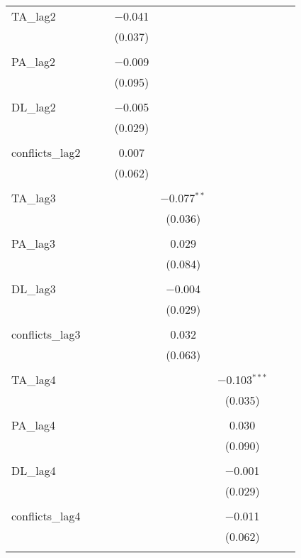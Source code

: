 \begin{table}[!htbp]
\begin{tabular}{@{\extracolsep{5pt}}lccccccc}
 TA\_lag2 &  &  & $-$0.041 &  &  &  &  \\ 
  &  &  & (0.037) &  &  &  &  \\ 
  & & & & & & & \\ 
 PA\_lag2 &  &  & $-$0.009 &  &  &  &  \\ 
  &  &  & (0.095) &  &  &  &  \\ 
  & & & & & & & \\ 
 DL\_lag2 &  &  & $-$0.005 &  &  &  &  \\ 
  &  &  & (0.029) &  &  &  &  \\ 
  & & & & & & & \\ 
 conflicts\_lag2 &  &  & 0.007 &  &  &  &  \\ 
  &  &  & (0.062) &  &  &  &  \\ 
  & & & & & & & \\ 
 TA\_lag3 &  &  &  & $-$0.077$^{**}$ &  &  &  \\ 
  &  &  &  & (0.036) &  &  &  \\ 
  & & & & & & & \\ 
 PA\_lag3 &  &  &  & 0.029 &  &  &  \\ 
  &  &  &  & (0.084) &  &  &  \\ 
  & & & & & & & \\ 
 DL\_lag3 &  &  &  & $-$0.004 &  &  &  \\ 
  &  &  &  & (0.029) &  &  &  \\ 
  & & & & & & & \\ 
 conflicts\_lag3 &  &  &  & 0.032 &  &  &  \\ 
  &  &  &  & (0.063) &  &  &  \\ 
  & & & & & & & \\ 
 TA\_lag4 &  &  &  &  & $-$0.103$^{***}$ &  &  \\ 
  &  &  &  &  & (0.035) &  &  \\ 
  & & & & & & & \\ 
 PA\_lag4 &  &  &  &  & 0.030 &  &  \\ 
  &  &  &  &  & (0.090) &  &  \\ 
  & & & & & & & \\ 
 DL\_lag4 &  &  &  &  & $-$0.001 &  &  \\ 
  &  &  &  &  & (0.029) &  &  \\ 
  & & & & & & & \\ 
 conflicts\_lag4 &  &  &  &  & $-$0.011 &  &  \\ 
  &  &  &  &  & (0.062) &  &  \\ 
  & & & & & & & \\ 

\end{tabular}
\end{table}
